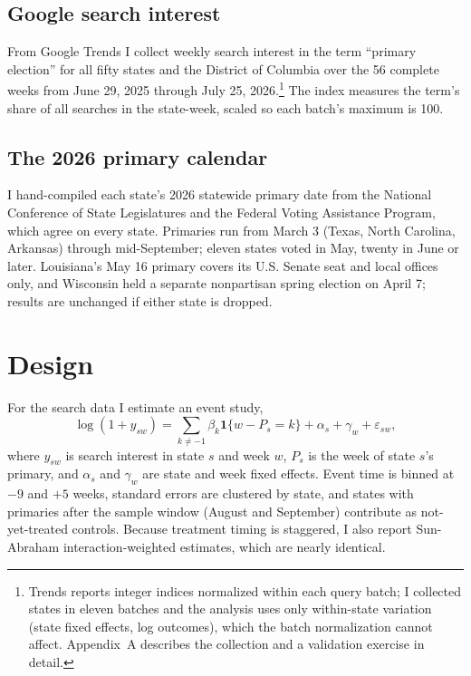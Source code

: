 \documentclass[12pt]{article}
\begin{document}
\subsection*{Google search interest}

From Google Trends I collect weekly search interest in the term ``primary election'' for all fifty states and the District of Columbia over the 56 complete weeks from June 29, 2025 through July 25, 2026.\footnote{Trends reports integer indices normalized within each query batch; I collected states in eleven batches and the analysis uses only within-state variation (state fixed effects, log outcomes), which the batch normalization cannot affect. Appendix~A describes the collection and a validation exercise in detail.} The index measures the term's share of all searches in the state-week, scaled so each batch's maximum is 100.

\subsection*{The 2026 primary calendar}

I hand-compiled each state's 2026 statewide primary date from the National Conference of State Legislatures and the Federal Voting Assistance Program, which agree on every state. Primaries run from March 3 (Texas, North Carolina, Arkansas) through mid-September; eleven states voted in May, twenty in June or later. Louisiana's May 16 primary covers its U.S. Senate seat and local offices only, and Wisconsin held a separate nonpartisan spring election on April 7; results are unchanged if either state is dropped.

\section*{Design}

For the search data I estimate an event study,
\begin{equation}
\log(1 + y_{sw}) = \sum_{k \neq -1} \beta_k \mathbf{1}\{w - P_s = k\} + \alpha_s + \gamma_w + \varepsilon_{sw},
\end{equation}
where $y_{sw}$ is search interest in state $s$ and week $w$, $P_s$ is the week of state $s$'s primary, and $\alpha_s$ and $\gamma_w$ are state and week fixed effects. Event time is binned at $-9$ and $+5$ weeks, standard errors are clustered by state, and states with primaries after the sample window (August and September) contribute as not-yet-treated controls. Because treatment timing is staggered, I also report Sun-Abraham interaction-weighted estimates, which are nearly identical.
\end{document}

